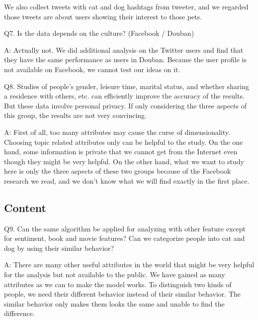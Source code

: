 \documentclass[12pt]{article}
\begin{document}
We also collect tweets with cat and dog hashtags from tweeter, and we regarded those tweets are about users showing their interest to those pets.

Q7. Is the data depends on the culture? (Facebook / Douban)

A: Actually not. We did additional analysis on the Twitter users and find that they have the same performance as users in Douban. Because the user profile is not available on Facebook, we cannot test our ideas on it.

Q8. Studies of people's gender, leisure time, marital status, and whether sharing a residence with others, etc. can efficiently improve the accuracy of the results. But these data involve personal privacy. If only considering the three aspects of this group, the results are not very convincing.

A: First of all, too many attributes may cause the curse of dimensionality. Choosing topic related attributes only can be helpful to the study. On the one hand, some information is private that we cannot get from the Internet even though they might be very helpful. On the other hand, what we want to study here is only the three aspects of these two groups because of the Facebook research we read, and we don't know what we will find exactly in the first place.

\subsection{Content}

Q9. Can the same algorithm be applied for analyzing with other feature except for sentiment, book and movie features? Can we categorize people into cat and dog by using their similar behavior?

A: There are many other useful attributes in the world that might be very helpful for the analysis but not available to the public. We have gained as many attributes as we can to make the model works. To distinguish two kinds of people, we need their different behavior instead of their similar behavior. The similar behavior only makes them looks the same and unable to find the difference.

\printbibliography
\end{document}
